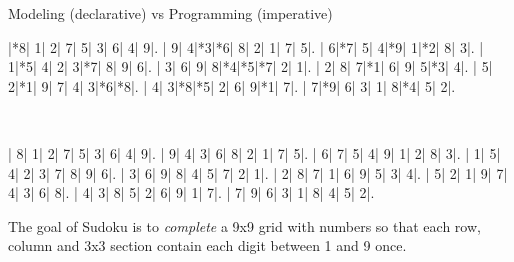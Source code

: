 \documentclass{cons-beamer}
\begin{document}
\begin{frame}{Modeling (declarative) vs Programming (imperative)}
	\begin{center}
	\end{center}
\end{frame}

\begin{frame}[fragile]
  \begin{example}[Sudoku]
    \begin{center}
      \vspace{2mm}
      \PuzzleUnitlength=11pt
      \renewcommand*\SudokuLinethickness{1pt}
      \renewcommand*\PuzzleFont{\sf\tiny}
      \begin{Sudoku}
        |*8| 1| 2| 7| 5| 3| 6| 4| 9|.
        | 9| 4|*3|*6| 8| 2| 1| 7| 5|.
        | 6|*7| 5| 4|*9| 1|*2| 8| 3|.
        | 1|*5| 4| 2| 3|*7| 8| 9| 6|.
        | 3| 6| 9| 8|*4|*5|*7| 2| 1|.
        | 2| 8| 7|*1| 6| 9| 5|*3| 4|.
        | 5| 2|*1| 9| 7| 4| 3|*6|*8|.
        | 4| 3|*8|*5| 2| 6| 9|*1| 7|.
        | 7|*9| 6| 3| 1| 8|*4| 5| 2|.
      \end{Sudoku}
      ~~~~~ 
      \PuzzleSolution
      \begin{Sudoku}
        | 8| 1| 2| 7| 5| 3| 6| 4| 9|.
        | 9| 4| 3| 6| 8| 2| 1| 7| 5|.
        | 6| 7| 5| 4| 9| 1| 2| 8| 3|.
        | 1| 5| 4| 2| 3| 7| 8| 9| 6|.
        | 3| 6| 9| 8| 4| 5| 7| 2| 1|.
        | 2| 8| 7| 1| 6| 9| 5| 3| 4|.
        | 5| 2| 1| 9| 7| 4| 3| 6| 8|.
        | 4| 3| 8| 5| 2| 6| 9| 1| 7|.
        | 7| 9| 6| 3| 1| 8| 4| 5| 2|.
      \end{Sudoku}
    \end{center}
    \vspace{-2mm}
    The goal of Sudoku is to \textit{complete} a 9x9 grid with numbers so that each row, column and 3x3 section contain each digit between 1 and 9 once.  %
  \end{example}
\end{frame}
\end{document}
